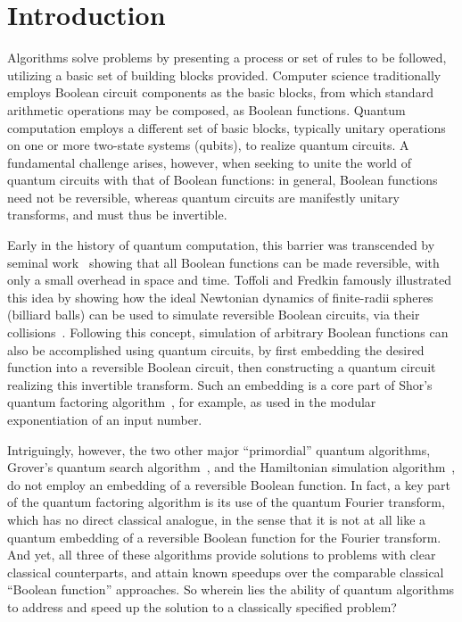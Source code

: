 \documentclass[aps,pra,showpacs,notitlepage,twocolumn,superscriptaddress,nofootinbib]{revtex4-1}
\begin{document}
\maketitle

\section{Introduction}\label{sec:Introduction}
    Algorithms solve problems by presenting a process or set of rules to be followed, utilizing a basic set of building blocks provided. Computer science traditionally employs Boolean circuit components as the basic blocks, from which standard arithmetic operations may be composed, as Boolean functions.  Quantum computation employs a different set of basic blocks, typically unitary operations on one or more two-state systems (qubits), to realize quantum circuits.  A fundamental challenge arises, however, when seeking to unite the world of quantum circuits with that of Boolean functions: in general, Boolean functions need not be reversible, whereas quantum circuits are manifestly unitary transforms, and must thus be invertible.
    
    Early in the history of quantum computation, this barrier was transcended by seminal work~\cite{bennett1989time} showing that all Boolean functions can be made reversible, with only a small overhead in space and time.  Toffoli and Fredkin famously illustrated this idea by showing how the ideal Newtonian dynamics of finite-radii spheres (billiard balls) can be used to simulate reversible Boolean circuits, via their collisions~\cite{fredkin1982conservative}.  Following this concept, simulation of arbitrary Boolean functions can also be accomplished using quantum circuits, by first embedding the desired function into a reversible Boolean circuit, then constructing a quantum circuit realizing this invertible transform.  Such an embedding is a core part of Shor's quantum factoring algorithm~\cite{shor1994algorithms}, for example, as used in the modular exponentiation of an input number.
    
    Intriguingly, however, the two other major ``primordial'' quantum algorithms, Grover's quantum search algorithm~\cite{grover1996fast}, and the Hamiltonian simulation algorithm~\cite{feynman1982simulating,lloyd1996universal}, do not employ an embedding of a reversible Boolean function.  In fact, a key part of the quantum factoring algorithm is its use of the quantum Fourier transform, which has no direct classical analogue, in the sense that it is not at all like a quantum embedding of a reversible Boolean function for the Fourier transform. And yet, all three of these algorithms provide solutions to problems with clear classical counterparts, and attain known speedups over the comparable classical ``Boolean function'' approaches.  So wherein lies the ability of quantum algorithms to address and speed up the solution to a classically specified problem?
    
\end{document}
